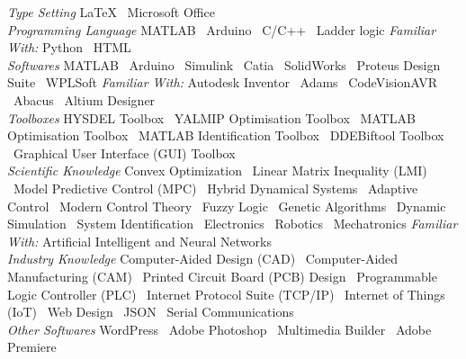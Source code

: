 \documentclass[a4paper,MMMyyyy,nonstopmode]{ResumeTemplate}
\begin{document}
\begin{Body}
\BulletItem
\textit{Type Setting}
\newline
{\LaTeX} \textbullet\ Microsoft Office
\\
\vspace{5pt}
\BulletItem
\textit{Programming Language}
\newline
MATLAB \textbullet\ 
Arduino \textbullet\ 
C/C++ \textbullet\ 
Ladder logic 
\newline
\textit{Familiar With:} Python \textbullet\ HTML
\\
\vspace{5pt}
\BulletItem
\textit{Softwares}
\newline
MATLAB \textbullet\ 
Arduino \textbullet\ 
Simulink \textbullet\ 
Catia \textbullet\
SolidWorks \textbullet\
Proteus Design Suite \textbullet\
WPLSoft
\newline
\textit{Familiar With:}
Autodesk Inventor \textbullet\
Adams \textbullet\
CodeVisionAVR \textbullet\ 
Abacus \textbullet\ 
Altium Designer
\\
\vspace{5pt}
\BulletItem
\textit{Toolboxes}
\newline
HYSDEL Toolbox \textbullet\
YALMIP Optimisation Toolbox \textbullet\
MATLAB Optimisation Toolbox \textbullet\
MATLAB Identification Toolbox \textbullet\
DDEBiftool Toolbox \textbullet\
Graphical User Interface (GUI) Toolbox
\\
\vspace{5pt}
\BulletItem
\textit{Scientific Knowledge}
\newline 
Convex Optimization \textbullet\
Linear Matrix Inequality (LMI) \textbullet\
Model Predictive Control (MPC) \textbullet\
Hybrid Dynamical Systems \textbullet\
Adaptive Control \textbullet\
Modern Control Theory \textbullet\
Fuzzy Logic \textbullet\
Genetic Algorithms \textbullet\ 
Dynamic Simulation \textbullet\
System Identification \textbullet\
Electronics \textbullet\ 
Robotics \textbullet\
Mechatronics 
\newline
\textit{Familiar With:} Artificial Intelligent and Neural Networks
\\
\vspace{5pt}
\BulletItem
\textit{Industry Knowledge}
\newline
Computer-Aided Design (CAD) \textbullet\
Computer-Aided Manufacturing (CAM) \textbullet\
Printed Circuit Board (PCB) Design \textbullet\
Programmable Logic Controller (PLC) \textbullet\
Internet Protocol Suite (TCP/IP) \textbullet\
Internet of Things (IoT) \textbullet\
Web Design \textbullet\
JSON \textbullet\
Serial Communications
\\
\vspace{5pt}
\BulletItem
\textit{Other Softwares}
\newline
WordPress \textbullet\ Adobe Photoshop \textbullet\ Multimedia Builder \textbullet\ Adobe Premiere


\end{Body}
\end{document}
